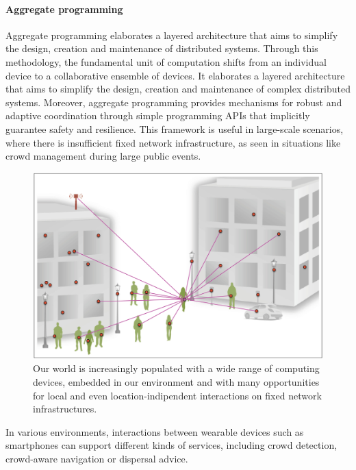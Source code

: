 \paragraph{Aggregate programming}
Aggregate programming elaborates a layered architecture that aims to simplify the design, creation and maintenance of
distributed systems.
Through this methodology, the fundamental unit of computation shifts from an individual device to a collaborative
ensemble of devices.
It elaborates a layered architecture that aims to simplify the design, creation and maintenance of complex distributed
systems.
Moreover, aggregate programming provides mechanisms for robust and adaptive coordination through simple programming APIs
that implicitly guarantee safety and resilience.
This framework is useful in large-scale scenarios, where there is insufficient fixed network infrastructure, as seen in
situations like crowd management during large public events.

\begin{figure} %
    \centering
    \includegraphics[width=.8\linewidth]{figures/smart_network_objects}
    \caption{Our world is increasingly populated with a wide range of computing devices, embedded in our environment
    and with many opportunities for local and even location-indipendent interactions on fixed network infrastructures.}
    \label{fig:smart-network-objects}
\end{figure}

In various environments, interactions between wearable devices such as smartphones can support different kinds of services,
including crowd detection, crowd-aware navigation or dispersal advice.

